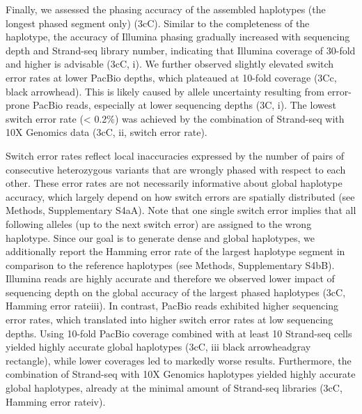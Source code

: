     Finally, we assessed the phasing accuracy of the assembled haplotypes (the longest phased segment only) (3cC). 
    Similar to the completeness of the haplotype, the accuracy of Illumina phasing gradually increased with sequencing depth and Strand-seq library number, indicating that Illumina coverage of 30-fold and higher is advisable (3cC, i). 
    We further observed slightly elevated switch error rates at lower PacBio depths, which plateaued at 10-fold coverage (3Cc, black arrowhead). 
    This is likely caused by allele uncertainty resulting from error-prone PacBio reads, especially at lower sequencing depths (3C, i). 
    The lowest switch error rate (< 0.2\%) was achieved by the combination of Strand-seq with 10X Genomics data (3cC, ii, switch error rate).
    
    Switch error rates reflect local inaccuracies expressed by the number of pairs of consecutive heterozygous variants that are wrongly phased with respect to each other. 
    These error rates are not necessarily informative about global haplotype accuracy, which largely depend on how switch errors are spatially distributed (see Methods, Supplementary S4aA). 
    Note that one single switch error implies that all following alleles (up to the next switch error) are assigned to the wrong haplotype. 
    Since our goal is to generate dense and global haplotypes, we additionally report the Hamming error rate of the largest haplotype segment in comparison to the reference haplotypes (see Methods, Supplementary S4bB). 
    Illumina reads are highly accurate and therefore we observed lower impact of sequencing depth on the global accuracy of the largest phased haplotypes (3cC, Hamming error rateiii). 
    In contrast, PacBio reads exhibited higher sequencing error rates, which translated into higher switch error rates at low sequencing depths. 
    Using 10-fold PacBio coverage combined with at least 10 Strand-seq cells yielded highly accurate global haplotypes (3cC, iii black arrowheadgray rectangle), 
    while lower coverages led to markedly worse results. Furthermore, the combination of Strand-seq with 10X Genomics haplotypes yielded highly accurate global haplotypes, 
    already at the minimal amount of Strand-seq libraries (3cC, Hamming error rateiv).
    
